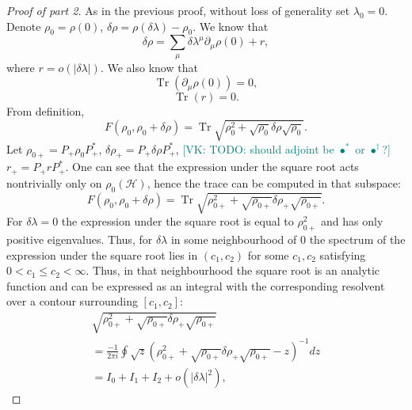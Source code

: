 \documentclass[
  american,aps,pra,reprint,floatfix,nofootinbib,superscriptaddress
]{revtex4-2}
\DeclareMathOperator{\Tr}{Tr}
\newcommand{\abs}[1]{\left|#1\right|}
\newcommand{\VK}[1]{\textcolor{teal}{[VK: #1]}}
\begin{document}
\begin{proof}[Proof of part 2]
  As in the previous proof, without loss of generality set $\lambda_0 = 0$.
  Denote $\rho_0 = \rho(0)$, $\delta \rho = \rho(\delta \lambda) - \rho_0$.
  We know that
  \begin{equation}
    \delta \rho = \sum_{\mu} \delta\lambda^\mu \partial_\mu\rho(0) + r,
  \end{equation}
  where $r = o(\abs{\delta \lambda})$. We also know that
  \begin{equation}
    \Tr\left(\partial_\mu\rho(0)\right) = 0,
  \end{equation}
  \begin{equation}
    \Tr(r) = 0.
  \end{equation}
  From definition,
  \begin{equation}
    F(\rho_0, \rho_0 + \delta \rho) =
    \Tr \sqrt{\rho_0^2 + \sqrt{\rho_0} \delta \rho \sqrt{\rho_0}}.
  \end{equation}
  Let $\rho_{0{+}} = P_{{+}} \rho_0 P_{{+}}^*$,
  $\delta\rho_{+} = P_{{+}} \delta\rho P_{{+}}^*$,
  \VK{TODO: should adjoint be $\bullet^*$ or $\bullet^\dagger$?}
  $r_{+} = P_{{+}} r P_{{+}}^*$. One can see that the expression under the
  square root acts nontrivially only on $\rho_0(\mathcal{H})$, hence the trace
  can be computed in that subspace:
  \begin{equation}
    \label{eq:F.Tr.sqrt}
    F(\rho_0, \rho_0 + \delta \rho) = \Tr \sqrt{
      \rho_{0{+}}^2 + \sqrt{\rho_{0{+}}} \delta \rho_{+} \sqrt{\rho_{0{+}}}
    }.
  \end{equation}
  For $\delta \lambda = 0$ the expression under the square root is equal to
  $\rho_{0{+}}^2$ and has only positive eigenvalues. Thus, for $\delta \lambda$
  in some neighbourhood of $0$ the spectrum of the expression under the square
  root lies in $(c_1, c_2)$ for some $c_1,c_2$ satisfying
  $0 < c_1 \leq c_2 < \infty$. Thus, in that neighbourhood the square root is
  an analytic function and can be expressed as an integral with the
  corresponding resolvent over a contour surrounding $[c_1, c_2]$:
  \begin{multline}
    \label{eq:oint}
    \sqrt{
      \rho_{0{+}}^2 + \sqrt{\rho_{0{+}}} \delta \rho_{+} \sqrt{\rho_{0{+}}}
    } \\
    = \frac{-1}{2\pi i} \oint \sqrt{z} \left(
      \rho_{0{+}}^2 + \sqrt{\rho_{0{+}}} \delta \rho_{+} \sqrt{\rho_{0{+}}} - z
    \right)^{-1} dz \\
    = I_0 + I_1 + I_2 + o(\abs{\delta \lambda}^2),

\end{multline}
\end{proof}
\end{document}
